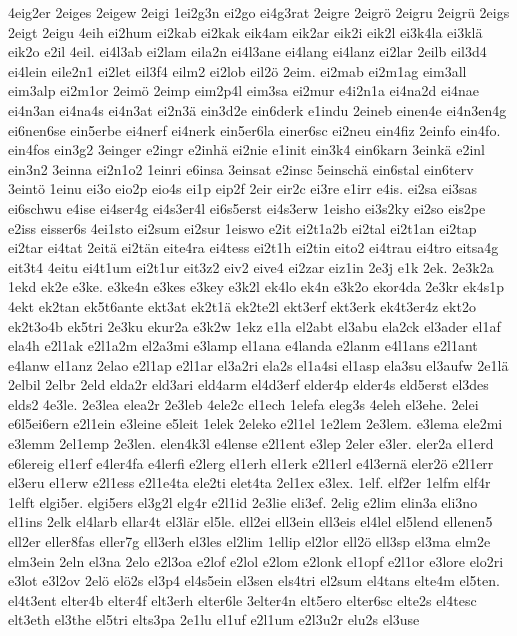 {4eig2er
2eiges
2eigew
2eigi
1ei2g3n
ei2go
ei4g3rat
2eigre
2eigrö
2eigru
2eigrü
2eigs
2eigt
2eigu
4eih
ei2hum
ei2kab
ei2kak
eik4am
eik2ar
eik2i
eik2l
ei3k4la
ei3klä
eik2o
e2il
4eil.
ei4l3ab
ei2lam
eila2n
ei4l3ane
ei4lang
ei4lanz
ei2lar
2eilb
eil3d4
ei4lein
eile2n1
ei2let
eil3f4
eilm2
ei2lob
eil2ö
2eim.
ei2mab
ei2m1ag
eim3all
eim3alp
ei2m1or
2eimö
2eimp
eim2p4l
eim3sa
ei2mur
e4i2n1a
ei4na2d
ei4nae
ei4n3an
ei4na4s
ei4n3at
ei2n3ä
ein3d2e
ein6derk
e1indu
2eineb
einen4e
ei4n3en4g
ei6nen6se
ein5erbe
ei4nerf
ei4nerk
ein5er6la
einer6sc
ei2neu
ein4fiz
2einfo
ein4fo.
ein4fos
ein3g2
3einger
e2ingr
e2inhä
ei2nie
e1init
ein3k4
ein6karn
3einkä
e2inl
ein3n2
3einna
ei2n1o2
1einri
e6insa
3einsat
e2insc
5einschä
ein6stal
ein6terv
3eintö
1einu
ei3o
eio2p
eio4s
ei1p
eip2f
2eir
eir2c
ei3re
e1irr
e4is.
ei2sa
ei3sas
ei6schwu
e4ise
ei4ser4g
ei4s3er4l
ei6s5erst
ei4s3erw
1eisho
ei3s2ky
ei2so
eis2pe
e2iss
eisser6s
4ei1sto
ei2sum
ei2sur
1eiswo
e2it
ei2t1a2b
ei2tal
ei2t1an
ei2tap
ei2tar
ei4tat
2eitä
ei2tän
eite4ra
ei4tess
ei2t1h
ei2tin
eito2
ei4trau
ei4tro
eitsa4g
eit3t4
4eitu
ei4t1um
ei2t1ur
eit3z2
eiv2
eive4
ei2zar
eiz1in
2e3j
e1k
2ek.
2e3k2a
1ekd
ek2e
e3ke.
e3ke4n
e3kes
e3key
e3k2l
ek4lo
ek4n
e3k2o
ekor4da
2e3kr
ek4s1p
4ekt
ek2tan
ek5t6ante
ekt3at
ek2t1ä
ek2te2l
ekt3erf
ekt3erk
ek4t3er4z
ekt2o
ek2t3o4b
ek5tri
2e3ku
ekur2a
e3k2w
1ekz
e1la
el2abt
el3abu
ela2ck
el3ader
el1af
ela4h
e2l1ak
e2l1a2m
el2a3mi
e3lamp
el1ana
e4landa
e2lanm
e4l1ans
e2l1ant
e4lanw
el1anz
2elao
e2l1ap
e2l1ar
el3a2ri
ela2s
el1a4si
el1asp
ela3su
el3aufw
2e1lä
2elbil
2elbr
2eld
elda2r
eld3ari
eld4arm
el4d3erf
elder4p
elder4s
eld5erst
el3des
elds2
4e3le.
2e3lea
elea2r
2e3leb
4ele2c
el1ech
1elefa
eleg3s
4eleh
el3ehe.
2elei
e6l5ei6ern
e2l1ein
e3leine
e5leit
1elek
2eleko
e2l1el
1e2lem
2e3lem.
e3lema
ele2mi
e3lemm
2el1emp
2e3len.
elen4k3l
e4lense
e2l1ent
e3lep
2eler
e3ler.
eler2a
el1erd
e6lereig
el1erf
e4ler4fa
e4lerfi
e2lerg
el1erh
el1erk
e2l1erl
e4l3ernä
eler2ö
e2l1err
el3eru
el1erw
e2l1ess
e2l1e4ta
ele2ti
elet4ta
2el1ex
e3lex.
1elf.
elf2er
1elfm
elf4r
1elft
elgi5er.
elgi5ers
el3g2l
elg4r
e2l1id
2e3lie
eli3ef.
2elig
e2lim
elin3a
eli3no
el1ins
2elk
el4larb
ellar4t
el3lär
el5le.
ell2ei
ell3ein
ell3eis
el4lel
el5lend
ellenen5
ell2er
eller8fas
eller7g
ell3erh
el3les
el2lim
1ellip
el2lor
ell2ö
ell3sp
el3ma
elm2e
elm3ein
2eln
el3na
2elo
e2l3oa
e2lof
e2lol
e2lom
e2lonk
el1opf
e2l1or
e3lore
elo2ri
e3lot
e3l2ov
2elö
elö2s
el3p4
el4s5ein
el3sen
els4tri
el2sum
el4tans
elte4m
el5ten.
el4t3ent
elter4b
elter4f
elt3erh
elter6le
3elter4n
elt5ero
elter6sc
elte2s
el4tesc
elt3eth
el3the
el5tri
elts3pa
2e1lu
el1uf
e2l1um
e2l3u2r
elu2s
el3use
}
